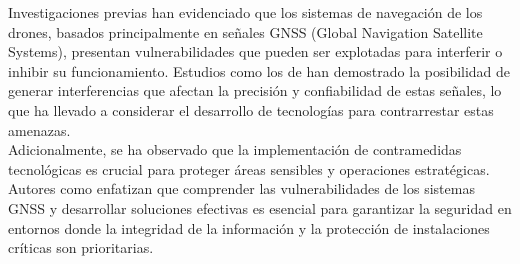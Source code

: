 
\begin{justify}
    
    Investigaciones previas han evidenciado que los sistemas de navegación de los drones, basados principalmente en señales GNSS
    (Global Navigation Satellite Systems), presentan vulnerabilidades que pueden ser explotadas para interferir o
    inhibir su funcionamiento. Estudios como los de \textcite{shepard2012evaluation} han demostrado la posibilidad de generar interferencias
    que afectan la precisión y confiabilidad de estas señales, lo que ha llevado a considerar el desarrollo de tecnologías para
    contrarrestar estas amenazas.\\
    
    \noindent Adicionalmente, se ha observado que la implementación de contramedidas tecnológicas es crucial para proteger áreas sensibles y
    operaciones estratégicas. Autores como \textcite{tippenhauer2011requirements} enfatizan que comprender las vulnerabilidades de los sistemas GNSS
    y desarrollar soluciones efectivas es esencial para garantizar la seguridad en entornos donde la integridad de la información y
    la protección de instalaciones críticas son prioritarias.

\end{justify}